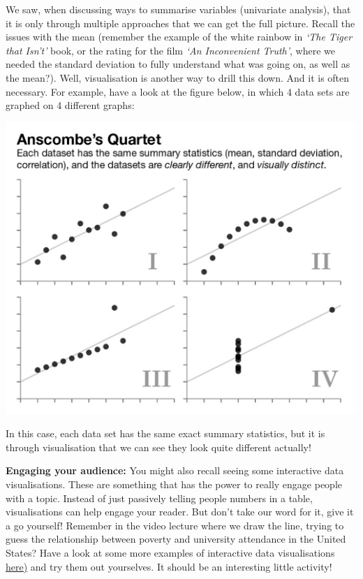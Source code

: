 \documentclass[
]{book}
\begin{document}
We saw, when discussing ways to summarise variables (univariate analysis), that it is only through multiple approaches that we can get the full picture. Recall the issues with the mean (remember the example of the white rainbow in \emph{`The Tiger that Isn't'} book, or the rating for the film \emph{`An Inconvenient Truth'}, where we needed the standard deviation to fully understand what was going on, as well as the mean?). Well, visualisation is another way to drill this down. And it is often necessary. For example, have a look at the figure below, in which 4 data sets are graphed on 4 different graphs:

\includegraphics{imgs/diff_viz_same_sums.png}

In this case, each data set has the same exact summary statistics, but it is through visualisation that we can see they look quite different actually!

\textbf{Engaging your audience:} You might also recall seeing some interactive data visualisations. These are something that has the power to really engage people with a topic. Instead of just passively telling people numbers in a table, visualisations can help engage your reader. But don't take our word for it, give it a go yourself! Remember in the video lecture where we draw the line, trying to guess the relationship between poverty and university attendance in the United States? Have a look at some more examples of interactive data visualisations \href{https://www.tableau.com/en-gb/learn/articles/interactive-map-and-data-visualization-examples}{here)} and try them out yourselves. It should be an interesting little activity!
\end{document}
